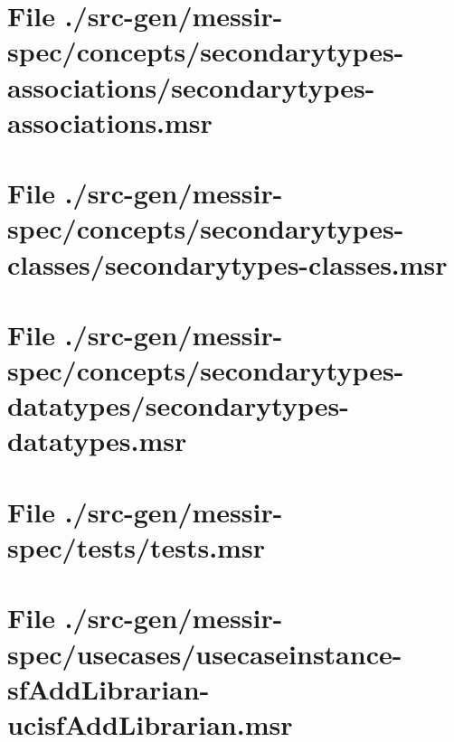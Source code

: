\section[File /src-gen/messir-spec/concepts.../secondarytypes-associations.msr]{File ./src-gen/messir-spec/concepts/secondarytypes-associations/secondarytypes-associations.msr}
\scriptsize

\normalsize
	
\section[File /src-gen/messir-spec/concepts.../secondarytypes-classes.msr]{File ./src-gen/messir-spec/concepts/secondarytypes-classes/secondarytypes-classes.msr}
\scriptsize

\normalsize
	
\section[File /src-gen/messir-spec/concepts.../secondarytypes-datatypes.msr]{File ./src-gen/messir-spec/concepts/secondarytypes-datatypes/secondarytypes-datatypes.msr}
\scriptsize

\normalsize
	
\section[File /src-gen/messir-spec/tests/tests.msr]{File ./src-gen/messir-spec/tests/tests.msr}
\scriptsize

\normalsize
	
\section[File /src-gen.../usecaseinstance-sfAddLibrarian-ucisfAddLibrarian.msr]{File ./src-gen/messir-spec/usecases/usecaseinstance-sfAddLibrarian-ucisfAddLibrarian.msr}
\scriptsize

\normalsize
	
